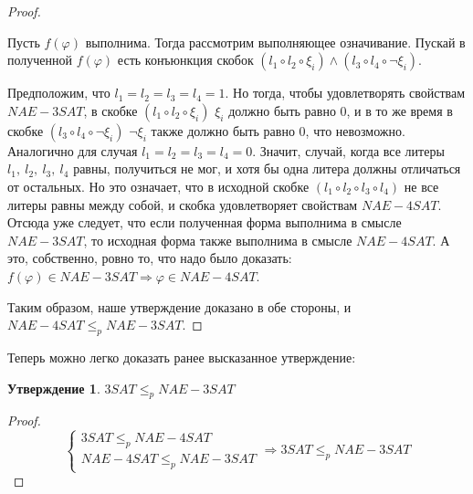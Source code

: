 \documentclass[a4paper,12pt]{article}
\newtheorem{statement}{Утверждение}
\begin{document}
\begin{proof}
\begin{itemize}
        Пусть $f(\varphi)$ выполнима. Тогда рассмотрим выполняющее означивание. Пускай в полученной $f(\varphi)$ есть конъюнкция скобок $(l_1 \circ l_2 \circ \xi_i) \wedge (l_3 \circ l_4 \circ \neg \xi_i)$. 
        
        Предположим, что $l_1 = l_2 = l_3 = l_4 = 1$. Но тогда, чтобы удовлетворять свойствам $NAE-3SAT$, в скобке $(l_1 \circ l_2 \circ \xi_i)$ $\xi_i$ должно быть равно 0, и в то же время в скобке $(l_3 \circ l_4 \circ \neg \xi_i)$ $\neg \xi_i$ также должно быть равно 0, что невозможно. Аналогично для случая $l_1 = l_2 = l_3 = l_4 = 0$. Значит, случай, когда все литеры $l_1,\ l_2,\ l_3,\ l_4$ равны, получиться не мог, и хотя бы одна литера должны отличаться от остальных. Но это означает, что в исходной скобке $(l_1 \circ l_2 \circ l_3 \circ l_4)$ не все литеры равны между собой, и скобка удовлетворяет свойствам $NAE-4SAT$. Отсюда уже следует, что если полученная форма выполнима в смысле $NAE-3SAT$, то исходная форма также выполнима в смысле $NAE-4SAT$. А это, собственно, ровно то, что надо было доказать:  $f(\varphi) \in NAE-3SAT \Longrightarrow  \varphi \in NAE-4SAT$.
    \end{itemize}
    Таким образом, наше утверждение доказано в обе стороны, и $NAE-4SAT \leqslant_p NAE-3SAT$.
\end{proof}
Теперь можно легко доказать ранее высказанное утверждение:
\begin{statement}
    $3SAT \leqslant_p NAE-3SAT$
\end{statement}
\begin{proof}
    \[\begin{cases}3SAT \leqslant_p NAE-4SAT\\ NAE-4SAT \leqslant_p NAE-3SAT\end{cases} \Longrightarrow 3SAT \leqslant_p NAE-3SAT\]
\end{proof}

\newpage
\end{document}
